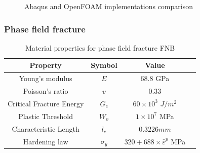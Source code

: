 \documentclass[sn-mathphys,Numbered,draft]{sn-jnl}%
\begin{document}
\begin{figure}[t!]
	\centering
	
		
		\caption{Abaqus and OpenFOAM implementations comparison}
	\label{label_for_entire_figure}
\end{figure}
\FloatBarrier

\subsubsection{Phase field fracture}

\begin{table}[htb]
	\centering
		\begin{tabular}{cccc} \hline
			Property & Symbol & Value  \\ \hline 
			Young's modulus & $E$ & $68.8$ GPa \\
			Poisson's ratio & $v$ & $0.33$   \\
			Critical Fracture Energy & $G_c$ & $60\times10^3$ $J/m^2$ \\
			Plastic Threshold & $W_o$ & $1\times10^7$ MPa \\
			Characteristic Length & $l_c$ & $0.3226mm$    \\
			Hardening law & $\sigma_y$ & $320+688\times{\bar{\varepsilon}}^p$ MPa  \\
			\hline
		\end{tabular}
	\caption{Material properties for phase field fracture FNB}
	\label{tab:material_properties}
\end{table}
\end{document}
